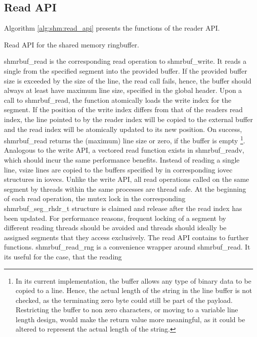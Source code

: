 \subsection{Read API}

Algorithm \ref{alg:shm:read_api} presents the functions of the reader API.
\begin{algorithm}[h!]
    
    \label{alg:shm:read_api}
    \caption[Shared Memory Ringbuffer: Read API]{Read API for the shared memory ringbuffer.}
\end{algorithm}

shmrbuf\_read is the corresponding read operation to shmrbuf\_write. It reads a single from
the specified segment into the provided buffer. If the provided buffer size is exceeded by the
size of the line, the read call fails, hence, the buffer should always at least have maximum line size, specified 
in the global header. Upon a call to shmrbuf\_read, the function atomically loads the write index for the segment. 
If the position of the write index differs from that of the readers read index, the line pointed to by 
the reader index will be copied to the external buffer and the read index will be atomically updated to its new position.
On success, shmrbuf\_read returns the (maximum) line size or zero, if the buffer is empty \footnote{In its current implementation, the buffer allows any type of binary data to be copied to a line. Hence, the actual length of the
string in the line buffer is not checked, as the terminating zero byte could still be part of the payload. Restricting the buffer to
non zero characters, or moving to a variable line length design, would make the return value more meaningful, as it could be altered to represent the actual length of the string.}.     
Analogous to the write API, a vectored read function exists in shmrbuf\_readv, which should incur the same performance benefits.
Instead of reading a single line, vsize lines are copied to the buffers specified by in corresponding iovec structures in iovecs.
Unlike the write API, all read operations called on the same segment by threads within the same processes are thread safe. 
At the beginning of each read operation, the mutex lock in the corresponding shmrbuf\_seg\_rhdr\_t structure is claimed and release after the read index has been updated.
For performance reasons, frequent locking of a segment by different reading threads should be avoided and threads should ideally be assigned segments that they access exclusively.
The read API contains to further functions. shmrbuf\_read\_rng is a convenience wrapper around shmrbuf\_read. It its useful for the case, that the reading
